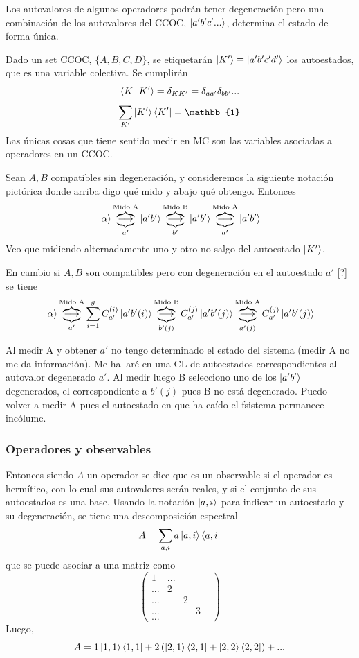 \documentclass[10pt,oneside]{CBFT_book}
\begin{document}
Los autovalores de algunos operadores podrán tener degeneración pero una combinación de los autovalores del CCOC, 
$\Ket{a'b'c'...}$, determina el estado de forma única.

Dado un set CCOC, $\{A,B,C,D\}$, se etiquetarán $\Ket{K'} \equiv \Ket{a'b'c'd'}$ los autoestados,
que es una variable colectiva.
Se cumplirán
\[
	\Braket{K | K'} = \delta_{KK'} = \delta_{aa'} \delta_{bb'} ...
\]
\[
	\sum_{K'} \Ket{K'}\Bra{K'} = \mathbb{1}
\]
Las únicas cosas que tiene sentido medir en MC son las variables asociadas a operadores en un CCOC.

Sean $A,B$ compatibles sin degeneración, y consideremos la siguiente notación pictórica donde
arriba digo qué mido y abajo qué obtengo. Entonces
\[
	\Ket{\alpha} \overbrace{\underbrace{\longrightarrow}_{a'}}^{\text{Mido A}} \Ket{a'b'}
	\overbrace{\underbrace{\longrightarrow}_{b'}}^{\text{Mido B}} \Ket{a'b'} 
	\overbrace{\underbrace{\longrightarrow}_{a'}}^{\text{Mido A}} \Ket{a'b'}
\]
Veo que midiendo alternadamente uno y otro no salgo del autoestado $\Ket{K'}$. 

En cambio si $A,B$ son compatibles pero con degeneración en el autoestado $a'$ [?] se tiene
\[
	\Ket{\alpha} \overbrace{\underbrace{\longrightarrow}_{a'}}^{\text{Mido A}} 
		\sum_{i=1}^g C_{a'}^{(i)}\Ket{a'b'(i)} \overbrace{\underbrace{\longrightarrow}_{b'(j)}}^{\text{Mido B}} 
		C_{a'}^{(j)}\Ket{a'b'(j)} \overbrace{\underbrace{\longrightarrow}_{a'(j)}}^{\text{Mido A}} 
		C_{a'}^{(j)} \Ket{a'b'(j)}
\]

Al medir A y obtener $a'$ no tengo determinado el estado del sistema (medir A no me da información). 
Me hallaré en una CL de autoestados correspondientes al autovalor degenerado $a'$. Al medir luego B 
selecciono uno de los $\Ket{a'b'}$ degenerados, el correspondiente a $b'(j)$ pues B no está degenerado. 
Puedo volver a medir A pues el autoestado en que ha caído el fsistema permanece incólume.

\subsubsection{Operadores y observables}

Entonces siendo $A$ un operador se dice que es un observable si el operador es hermítico, con lo cual
sus autovalores serán reales, y si el conjunto de sus autoestados es una base.
Usando la notación $\Ket{a,i}$ para indicar un autoestado y su degeneración, se tiene una 
descomposición espectral
\[
	A = \sum_{a,i} a \Ket{a,i}\Bra{a,i}
\]
que se puede asociar a una matriz como
\[
	\begin{pmatrix}
	1 & ... &  & & \\
	... & 2 & & & \\
	... & & 2 & & \\
	... & & & 3 &  \\
	... & & & & 
	\end{pmatrix}
\]
Luego,
\[
	A = 1 \Ket{1,1}\Bra{1,1} + 2 \left( \Ket{2,1}\Bra{2,1} + \Ket{2,2}\Bra{2,2}\right) + ...
\]
\end{document}
